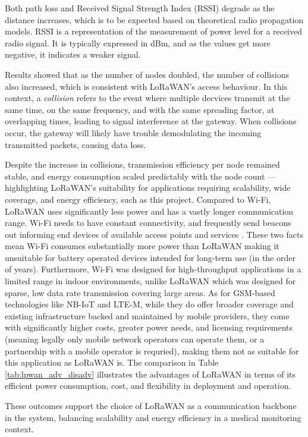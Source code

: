 Both path loss and Received Signal Strength Index (RSSI) degrade as the distance increases, which is to be expected based on theoretical radio propagation models. RSSI is a representation of the measurement of power level for a received radio signal. It is typically expressed in dBm, and as the values get more negative, it indicates a weaker signal.

Results showed that as the number of nodes doubled, the number of collisions also increased, which is consistent with LoRaWAN's access behaviour. In this context, a \textit{collision} refers to the event where multiple decvices transmit at the same time, on the same frequency, and with the same spreading factor, at overlapping times, leading to signal interference at the gateway. When collisions occur, the gateway will likely have trouble demodulating the incoming transmitted packets, causing data loss.

Despite the increase in collisions, transmission efficiency per node remained stable, and energy consumption scaled predictably with the node count --- highlighting LoRaWAN's suitability for applications requiring scalability, wide coverage, and energy efficiency, such as this project. Compared to Wi-Fi, LoRaWAN uses significantly less power and has a vastly longer communication range. Wi-Fi needs to have constant connectivity, and frequently send beacons out informing end devices of available access points and services \cite{wifi_beacons}. These two facts mean Wi-Fi consumes substantially more power than LoRaWAN making it unsuitable for battery operated devices intended for long-term use (in the order of years). Furthermore, Wi-Fi was designed for high-throughput applications in a limited range in indoor environments, unlike LoRaWAN which was designed for sparse, low data rate transmission covering large areas. As for GSM-based technologies like NB-IoT and LTE-M, while they do offer broader coverage and existing infrastructure backed and maintained by mobile providers, they come with significantly higher costs, greater power needs, and licensing requirements (meaning legally only mobile network operators can operate them, or a partnership with a mobile operator is requried), making them not as suitable for this application as LoRaWAN is. The comparison in Table \ref{tab:lpwan_adv_disadv} illustrates the advantages of LoRaWAN in terms of its efficient power consumption, cost, and flexibility in deployment and operation.

These outcomes support the choice of LoRaWAN as a communication backbone in the system, balancing scalability and energy efficiency in a medical monitoring context.

